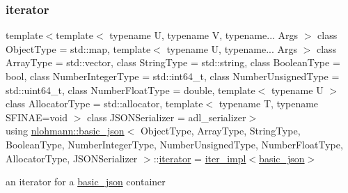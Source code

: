 \subsubsection{\texorpdfstring{iterator}{iterator}}
{\footnotesize\ttfamily template$<$template$<$ typename U, typename V, typename... Args $>$ class Object\+Type = std\+::map, template$<$ typename U, typename... Args $>$ class Array\+Type = std\+::vector, class String\+Type  = std\+::string, class Boolean\+Type  = bool, class Number\+Integer\+Type  = std\+::int64\+\_\+t, class Number\+Unsigned\+Type  = std\+::uint64\+\_\+t, class Number\+Float\+Type  = double, template$<$ typename U $>$ class Allocator\+Type = std\+::allocator, template$<$ typename T, typename S\+F\+I\+N\+A\+E=void $>$ class J\+S\+O\+N\+Serializer = adl\+\_\+serializer$>$ \\
using \mbox{\hyperlink{classnlohmann_1_1basic__json}{nlohmann\+::basic\+\_\+json}}$<$ Object\+Type, Array\+Type, String\+Type, Boolean\+Type, Number\+Integer\+Type, Number\+Unsigned\+Type, Number\+Float\+Type, Allocator\+Type, J\+S\+O\+N\+Serializer $>$\+::\mbox{\hyperlink{classnlohmann_1_1basic__json_a099316232c76c034030a38faa6e34dca}{iterator}} =  \mbox{\hyperlink{classnlohmann_1_1basic__json_1_1iter__impl}{iter\+\_\+impl}}$<$\mbox{\hyperlink{classnlohmann_1_1basic__json}{basic\+\_\+json}}$>$}



an iterator for a \mbox{\hyperlink{classnlohmann_1_1basic__json}{basic\+\_\+json}} container 

\mbox{\label{classnlohmann_1_1basic__json_a7768841baaaa7a21098a401c932efaff}} 
